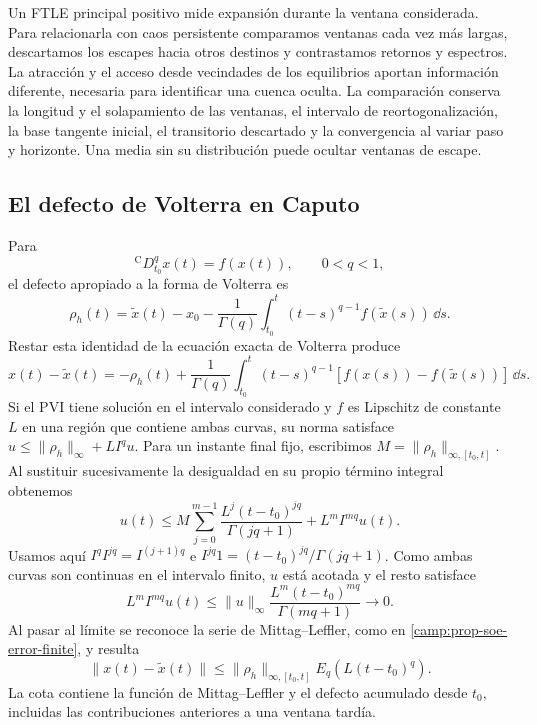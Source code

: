 Un FTLE principal positivo mide expansión durante la ventana considerada.
Para relacionarla con caos persistente comparamos ventanas cada vez más
largas, descartamos los escapes hacia otros destinos y contrastamos retornos
y espectros. La atracción y el acceso desde vecindades de los equilibrios
aportan información diferente, necesaria para identificar una cuenca oculta.
La comparación conserva la longitud y el solapamiento de las ventanas,
el intervalo de reortogonalización, la base tangente inicial, el transitorio
descartado y la convergencia al variar paso y horizonte. Una media sin su
distribución puede ocultar ventanas de escape.

\subsection{El defecto de Volterra en Caputo}

Para
\begin{equation}
 {}^{\mathrm C}D_{t_0}^{q}x(t)=f(x(t)),\qquad 0<q<1,
 \label{eq:reliability-caputo}
\end{equation}
el defecto apropiado a la forma de Volterra es
\begin{equation}
 \rho_h(t)=\widetilde x(t)-x_0
 -\frac1{\Gamma(q)}
 \int_{t_0}^{t}(t-s)^{q-1}f(\widetilde x(s))\,\dd s .
 \label{eq:reliability-volterra-defect}
\end{equation}
Restar esta identidad de la ecuación exacta de Volterra produce
\[
 x(t)-\widetilde x(t)=-\rho_h(t)+\frac1{\Gamma(q)}
 \int_{t_0}^t(t-s)^{q-1}[f(x(s))-f(\widetilde x(s))]\,\dd s.
\]
Si el PVI tiene solución en el intervalo considerado y \(f\) es Lipschitz
de constante \(L\) en una región que contiene ambas curvas, su norma satisface
\(u\leq\|\rho_h\|_\infty+LI^qu\). Para un instante final fijo,
escribimos \(M=\|\rho_h\|_{\infty,[t_0,t]}\). Al sustituir sucesivamente
la desigualdad en su propio término integral obtenemos
\[
 u(t)\le M\sum_{j=0}^{m-1}
 \frac{L^j(t-t_0)^{jq}}{\Gamma(jq+1)}+L^mI^{mq}u(t).
\]
Usamos aquí \(I^qI^{jq}=I^{(j+1)q}\) e
\(I^{jq}1=(t-t_0)^{jq}/\Gamma(jq+1)\). Como ambas curvas son continuas
en el intervalo finito, \(u\) está acotada y el resto satisface
\[
 L^mI^{mq}u(t)\le\|u\|_\infty
 \frac{L^m(t-t_0)^{mq}}{\Gamma(mq+1)}\longrightarrow0.
\]
Al pasar al límite se reconoce la serie de Mittag--Leffler, como en
\cref{camp:prop-soe-error-finite}, y resulta
\cite{Lin2013GeneralizedGronwall}
\begin{equation}
 \|x(t)-\widetilde x(t)\|
 \leq
 \|\rho_h\|_{\infty,[t_0,t]}
 E_q\!\left(L(t-t_0)^q\right).
 \label{eq:reliability-fractional-gronwall}
\end{equation}
La cota contiene la función de Mittag--Leffler y el defecto acumulado desde
\(t_0\), incluidas las contribuciones anteriores a una ventana tardía.

